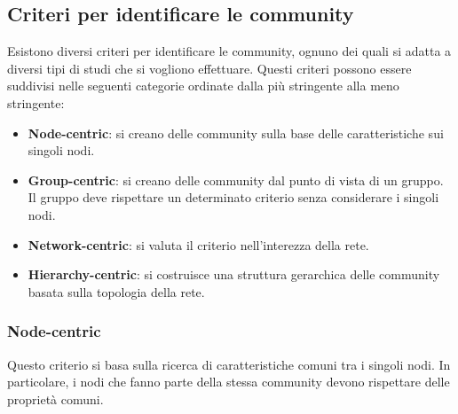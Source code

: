 \subsection{Criteri per identificare le community}
Esistono diversi criteri per identificare le community, ognuno dei quali si adatta
a diversi tipi di studi che si vogliono effettuare. Questi criteri possono essere
suddivisi nelle seguenti categorie  ordinate dalla più stringente alla meno
stringente:
\begin{itemize}
    \item \textbf{Node-centric}: si creano delle community sulla base delle
          caratteristiche sui singoli nodi.
    \item \textbf{Group-centric}: si creano delle community dal punto di vista
          di un gruppo. Il gruppo deve rispettare un determinato criterio senza
          considerare i singoli nodi.
    \item \textbf{Network-centric}: si valuta il criterio nell'interezza della rete.
    \item \textbf{Hierarchy-centric}: si costruisce una struttura gerarchica delle
          community basata sulla topologia della rete.
\end{itemize}
\subsubsection{Node-centric}
Questo criterio si basa sulla ricerca di caratteristiche comuni tra i singoli
nodi. In particolare, i nodi che fanno parte della stessa community devono
rispettare delle proprietà comuni.

